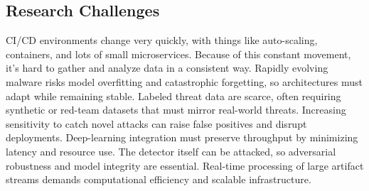 \subsection{Research Challenges}
CI/CD environments change very quickly, with things like auto-scaling, containers, and lots of small microservices. Because of this constant movement, it’s hard to gather and analyze data in a consistent way. Rapidly evolving malware risks model overfitting and catastrophic forgetting, so architectures must adapt while remaining stable. Labeled threat data are scarce, often requiring synthetic or red-team datasets that must mirror real-world threats. Increasing sensitivity to catch novel attacks can raise false positives and disrupt deployments. Deep-learning integration must preserve throughput by minimizing latency and resource use. The detector itself can be attacked, so adversarial robustness and model integrity are essential. Real-time processing of large artifact streams demands computational efficiency and scalable infrastructure.















